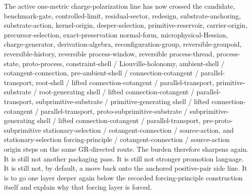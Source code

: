 \documentclass[11pt]{article}
\begin{document}
The active one-metric charge-polarization line has now crossed the candidate, benchmark-gate, controlled-limit, residual-sector, redesign, substrate-anchoring, substrate-action, kernel-origin, deeper-selection, primitive-reservoir, carrier-origin, precursor-selection, exact-preservation normal-form, microphysical-Hessian, charge-generator, derivation-algebra, reconfiguration-group, reversible-groupoid, reversible-history, reversible process-window, reversible process-thread, process-state, proto-process, constraint-shell / Liouville-holonomy, ambient-shell / cotangent-connection, pre-ambient-shell / connection-cotangent / parallel-transport, root-shell / lifted connection-cotangent / parallel-transport, primitive-substrate / root-generating shell / lifted connection-cotangent / parallel-transport, subprimitive-substrate / primitive-generating shell / lifted connection-cotangent / parallel-transport, proto-subprimitive-substrate / subprimitive-generating shell / lifted connection-cotangent / parallel-transport, pre-proto-subprimitive stationary-selection / cotangent-connection / source-action, and stationary-selection forcing-principle / cotangent-connection / source-action origin steps on the same GR-directed route. The burden therefore sharpens again. It is still not another packaging pass. It is still not stronger promotion language. It is still not, by default, a move back onto the anchored positive-pair side line. It is to go one layer deeper again below the recorded forcing-principle construction itself and explain why that forcing layer is forced.
\end{document}
